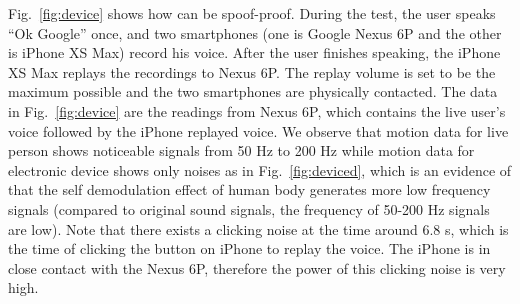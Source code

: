 Fig.~\ref{fig:device} shows how {\shortname} can be spoof-proof. During the test, the user speaks ``Ok Google'' once, and two smartphones (one is Google Nexus 6P and the other is iPhone XS Max) record his voice. After the user finishes speaking, the iPhone XS Max replays the recordings to Nexus 6P. The replay volume is set to be the maximum possible and the two smartphones are physically contacted. The data in Fig.~\ref{fig:device} are the readings from Nexus 6P, which contains the live user's voice followed by the iPhone replayed voice. We observe that motion data for live person shows noticeable signals from 50 Hz to 200 Hz while motion data for electronic device shows only noises as in Fig.~\ref{fig:deviced}, which is an evidence of that the self demodulation effect of human body generates more low frequency signals (compared to original sound signals, the frequency of 50-200 Hz signals are low). Note that there exists a clicking noise at the time around 6.8 s, which is the time of clicking the button on iPhone to replay the voice. The iPhone is in close contact with the Nexus 6P, therefore the power of this clicking noise is very high.


